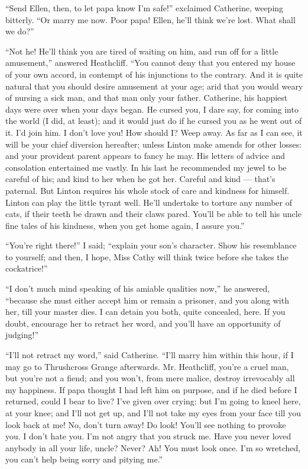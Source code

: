 \par “Send Ellen, then, to let papa know I'm safe!” exclaimed Catherine, weeping bitterly. “Or marry me now. Poor papa! Ellen, he'll think we're lost. What shall we do?”
\par “Not he! He'll think you are tired of waiting on him, and run off for a little amusement,” answered Heathcliff. “You cannot deny that you entered my house of your own accord, in contempt of his injunctions to the contrary. And it is quite natural that you should desire amusement at your age; arid that you would weary of nursing a sick man, and that man only your father. Catherine, his happiest days were over when your days began. He cursed you, I dare say, for coming into the world (I did, at least); and it would just do if he cursed you as he went out of it. I'd join him. I don't love you! How should I? Weep away. As far as I can see, it will be your chief diversion hereafter; unless Linton make amends for other losses: and your provident parent appears to fancy he may. His letters of advice and consolation entertained me vastly. In his last he recommended my jewel to be careful of his; and kind to her when he got her. Careful and kind — that's paternal. But Linton requires his whole stock of care and kindness for himself. Linton can play the little tyrant well. He'll undertake to torture any number of cats, if their teeth be drawn and their claws pared. You'll be able to tell his uncle fine tales of his kindness, when you get home again, I assure you.”
\par “You're right there!” I said; “explain your son's character. Show his resemblance to yourself; and then, I hope, Miss Cathy will think twice before she takes the cockatrice!”
\par “I don't much mind speaking of his amiable qualities now,” he answered, “because she must either accept him or remain a prisoner, and you along with her, till your master dies. I can detain you both, quite concealed, here. If you doubt, encourage her to retract her word, and you'll have an opportunity of judging!”
\par “I'll not retract my word,” said Catherine. “I'll marry him within this hour, if I may go to Thrushcross Grange afterwards. Mr. Heathcliff, you're a cruel man, but you're not a fiend; and you won't, from mere malice, destroy irrevocably all my happiness. If papa thought I had left him on purpose, and if he died before I returned, could I bear to live? I've given over crying: but I'm going to kneel here, at your knee; and I'll not get up, and I'll not take my eyes from your face till you look back at me! No, don't turn away! Do look! You'll see nothing to provoke you. I don't hate you. I'm not angry that you struck me. Have you never loved anybody in all your life, uncle? Never? Ah! You must look once. I'm so wretched, you can't help being sorry and pitying me.”
